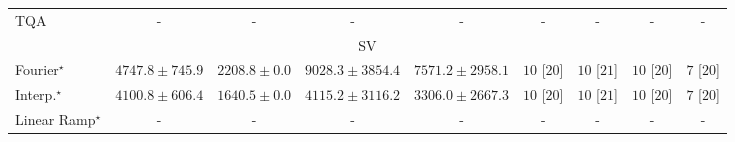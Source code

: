 \begin{tabular}{l|cccc|cccc|}
TQA & {\cellcolor[HTML]{000000}} \color[HTML]{F1F1F1} {\cellcolor{white}} \color{black} - & {\cellcolor[HTML]{000000}} \color[HTML]{F1F1F1} {\cellcolor{white}} \color{black} - & {\cellcolor[HTML]{000000}} \color[HTML]{F1F1F1} {\cellcolor{white}} \color{black} - & {\cellcolor[HTML]{000000}} \color[HTML]{F1F1F1} {\cellcolor{white}} \color{black} - & {\cellcolor[HTML]{000000}} \color[HTML]{F1F1F1} {\cellcolor{white}} \color{black} - & {\cellcolor[HTML]{000000}} \color[HTML]{F1F1F1} {\cellcolor{white}} \color{black} - & {\cellcolor[HTML]{000000}} \color[HTML]{F1F1F1} {\cellcolor{white}} \color{black} - & {\cellcolor[HTML]{000000}} \color[HTML]{F1F1F1} {\cellcolor{white}} \color{black} - \\
\cline{1-9}
\multicolumn{9}{c}{\rule{0pt}{8pt}SV} \\
\midrule
Fourier$^\star$ & {\cellcolor[HTML]{96B6D7}} \color[HTML]{000000} $4747.8\pm 745.9$ & {\cellcolor[HTML]{F4EDF6}} \color[HTML]{000000} $2208.8\pm 0.0$ & {\cellcolor[HTML]{023B5D}} \color[HTML]{F1F1F1} $9028.3\pm 3854.4$ & {\cellcolor[HTML]{0569A4}} \color[HTML]{F1F1F1} $7571.2\pm 2958.1$ & {\cellcolor[HTML]{49006A}} \color[HTML]{F1F1F1} $10$ [$20$] & {\cellcolor[HTML]{49006A}} \color[HTML]{F1F1F1} $10$ [$21$] & {\cellcolor[HTML]{49006A}} \color[HTML]{F1F1F1} $10$ [$20$] & {\cellcolor[HTML]{CD238F}} \color[HTML]{F1F1F1} $7$ [$20$] \\
Interp.$^\star$ & {\cellcolor[HTML]{B7C5DF}} \color[HTML]{000000} $4100.8\pm 606.4$ & {\cellcolor[HTML]{FFF7FB}} \color[HTML]{000000} $1640.5\pm 0.0$ & {\cellcolor[HTML]{B5C4DF}} \color[HTML]{000000} $4115.2\pm 3116.2$ & {\cellcolor[HTML]{D7D6E9}} \color[HTML]{000000} $3306.0\pm 2667.3$ & {\cellcolor[HTML]{49006A}} \color[HTML]{F1F1F1} $10$ [$20$] & {\cellcolor[HTML]{49006A}} \color[HTML]{F1F1F1} $10$ [$21$] & {\cellcolor[HTML]{49006A}} \color[HTML]{F1F1F1} $10$ [$20$] & {\cellcolor[HTML]{CD238F}} \color[HTML]{F1F1F1} $7$ [$20$] \\
Linear Ramp$^\star$ & {\cellcolor[HTML]{000000}} \color[HTML]{F1F1F1} {\cellcolor{white}} \color{black} - & {\cellcolor[HTML]{000000}} \color[HTML]{F1F1F1} {\cellcolor{white}} \color{black} - & {\cellcolor[HTML]{000000}} \color[HTML]{F1F1F1} {\cellcolor{white}} \color{black} - & {\cellcolor[HTML]{000000}} \color[HTML]{F1F1F1} {\cellcolor{white}} \color{black} - & {\cellcolor[HTML]{000000}} \color[HTML]{F1F1F1} {\cellcolor{white}} \color{black} - & {\cellcolor[HTML]{000000}} \color[HTML]{F1F1F1} {\cellcolor{white}} \color{black} - & {\cellcolor[HTML]{000000}} \color[HTML]{F1F1F1} {\cellcolor{white}} \color{black} - & {\cellcolor[HTML]{000000}} \color[HTML]{F1F1F1} {\cellcolor{white}} \color{black} - \\

\end{tabular}
